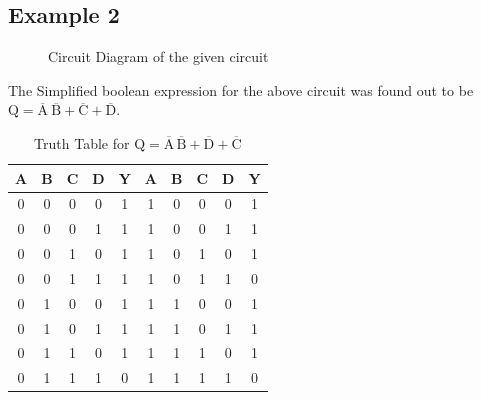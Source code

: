 \documentclass{scrartcl}
\newcommand{\1}{\mathbbm{1}}
\begin{document}
\subsection{Example 2}
\begin{figure}[H]
        \centering
        
        \caption{Circuit Diagram of the given circuit}
\end{figure}
The Simplified boolean expression for the above circuit was found out to be
$\mathrm{Q = \overline{A}\ \overline{B}+ \overline{C} + \overline{D}}$.
\begin{table}[H]
\centering
\caption{Truth Table for \(\mathrm{ \mathrm{Q} = \overline{A}\,\overline{B} + \overline{D} + \overline{C} }\)}
\vspace{0.2cm}
\begin{tabular}{|c|c|c|c||c|||c|c|c|c||c|}
\hline
\textbf{A} & \textbf{B} & \textbf{C} & \textbf{D} & \textbf{Y} & \textbf{A} & \textbf{B} & \textbf{C} & \textbf{D} & \textbf{Y} \\
\hline
0 & 0 & 0 & 0 & 1 & 1 & 0 & 0 & 0 & 1 \\
0 & 0 & 0 & 1 & 1 & 1 & 0 & 0 & 1 & 1 \\
0 & 0 & 1 & 0 & 1 & 1 & 0 & 1 & 0 & 1 \\
0 & 0 & 1 & 1 & 1 & 1 & 0 & 1 & 1 & 0 \\
0 & 1 & 0 & 0 & 1 & 1 & 1 & 0 & 0 & 1 \\
0 & 1 & 0 & 1 & 1 & 1 & 1 & 0 & 1 & 1 \\
0 & 1 & 1 & 0 & 1 & 1 & 1 & 1 & 0 & 1 \\
0 & 1 & 1 & 1 & 0 & 1 & 1 & 1 & 1 & 0 \\
\hline
\end{tabular}
\end{table}
\end{document}

